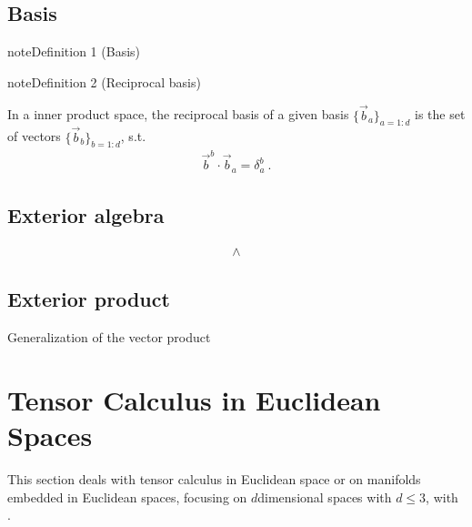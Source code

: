 \documentclass[letterpaper,10pt,english]{jupyterBook}
\begin{document}
\section{Basis}
\label{\detokenize{ch/tensor-algebra-calculus/algebra:basis}}\label{ch/tensor-algebra-calculus/algebra:definition-0}
\begin{sphinxadmonition}{note}{Definition 1 (Basis)}


\end{sphinxadmonition}
\label{ch/tensor-algebra-calculus/algebra:definition-1}
\begin{sphinxadmonition}{note}{Definition 2 (Reciprocal basis)}



\sphinxAtStartPar
In a inner product space, the reciprocal basis of a given basis \(\{ \vec{b}_a \}_{a=1:d}\) is the set of vectors \(\{ \vec{b}_{b} \}_{b=1:d}\), s.t.
\begin{equation*}
\begin{split}\vec{b}^b \cdot \vec{b}_a = \delta_a^b \ .\end{split}
\end{equation*}\end{sphinxadmonition}


\section{Exterior algebra}
\label{\detokenize{ch/tensor-algebra-calculus/algebra:exterior-algebra}}\begin{equation*}
\begin{split}\land\end{split}
\end{equation*}

\section{Exterior product}
\label{\detokenize{ch/tensor-algebra-calculus/algebra:exterior-product}}
\sphinxAtStartPar
Generalization of the vector product

\sphinxstepscope


\chapter{Tensor Calculus in Euclidean Spaces}
\label{\detokenize{ch/tensor-algebra-calculus/calculus-euclidean:tensor-calculus-in-euclidean-spaces}}\label{\detokenize{ch/tensor-algebra-calculus/calculus-euclidean:tensor-calculus}}\label{\detokenize{ch/tensor-algebra-calculus/calculus-euclidean::doc}}
\sphinxAtStartPar
This section deals with tensor calculus in Euclidean space or on manifolds embedded in Euclidean spaces, focusing on \(d\)\sphinxhyphen{}dimensional spaces with \(d \le 3\), with .
\end{document}
